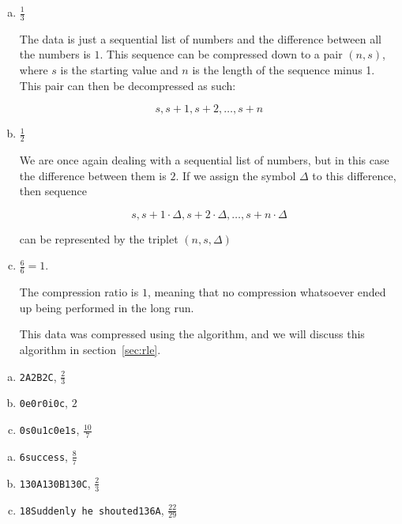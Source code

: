 \begin{Answer}[ref={compression-ratio}]

  \begin{enumerate}[(a)]
  \item $\frac{1}{3}$

    The data is just a sequential list of numbers and the difference
    between all the numbers is $1$. This sequence can be compressed
    down to a pair $(n,s)$, where $s$ is the starting value and $n$ is
    the length of the sequence minus 1. This pair can then be decompressed
    as such:

    \begin{equation*}
     s,s+1,s+2,\dots,s+n
    \end{equation*}

  \item $\frac{1}{2}$

    We are once again dealing with a sequential list of numbers, but
    in this case the difference between them is $2$. If we assign the
    symbol $\Delta$ to this difference, then sequence

    \begin{equation*}
      s, s + 1 \cdot \Delta, s + 2 \cdot \Delta, \dots, s + n \cdot \Delta
    \end{equation*}

    can be represented by the triplet $(n,s,\Delta)$

  \item $\frac{6}{6} = 1$.

    The compression ratio is $1$, meaning that no compression
    whatsoever ended up being performed in the long run.

    This data was compressed using the \rle algorithm, and we will
    discuss this algorithm in section~\ref{sec:rle}.

  \end{enumerate}
\end{Answer}

\begin{Answer}[ref={rle-compression}]

  \begin{enumerate}[(a)]
  \item \texttt{2A2B2C}, $\frac{2}{3}$
  \item \texttt{0e0r0i0c}, $2$
  \item \texttt{0s0u1c0e1s}, $\frac{10}{7}$
  \end{enumerate}

\end{Answer}

\begin{Answer}[ref={packbits-rle}]

  \begin{enumerate}[(a)]
  \item \texttt{6success}, $\frac{8}{7}$
  \item \texttt{130A130B130C}, $\frac{2}{3}$
  \item \texttt{18Suddenly he shouted136A}, $\frac{22}{29}$
  \end{enumerate}

\end{Answer}

